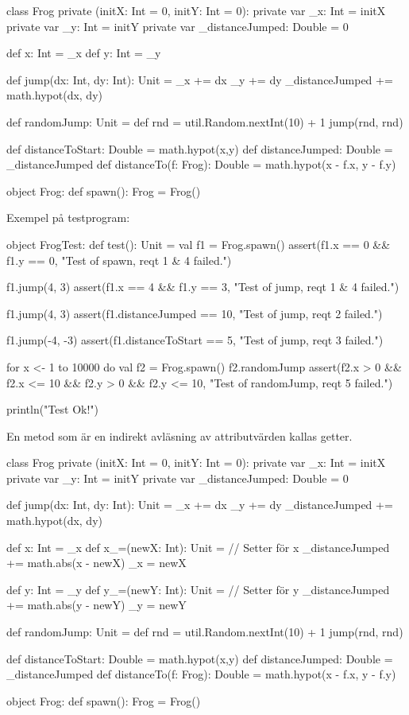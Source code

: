 \SOLUTION


\TaskSolved \what


\SubtaskSolved
\begin{Code}
class Frog private (initX: Int = 0, initY: Int = 0):
  private var _x: Int = initX
  private var _y: Int = initY
  private var _distanceJumped: Double = 0

  def x: Int = _x
  def y: Int = _y

  def jump(dx: Int, dy: Int): Unit =
    _x += dx
    _y += dy
    _distanceJumped += math.hypot(dx, dy)


  def randomJump: Unit =
    def rnd = util.Random.nextInt(10) + 1
    jump(rnd, rnd)

  def distanceToStart: Double = math.hypot(x,y)
  def distanceJumped: Double = _distanceJumped
  def distanceTo(f: Frog): Double = math.hypot(x - f.x, y - f.y)

object Frog:
  def spawn(): Frog = Frog()
\end{Code}

\SubtaskSolved Exempel på testprogram:
\begin{Code}
object FrogTest:
  def test(): Unit =
    val f1 = Frog.spawn()
    assert(f1.x == 0 && f1.y == 0, "Test of spawn, reqt 1 & 4 failed.")

    f1.jump(4, 3)
    assert(f1.x == 4 && f1.y == 3, "Test of jump, reqt 1 & 4 failed.")

    f1.jump(4, 3)
    assert(f1.distanceJumped == 10, "Test of jump, reqt 2 failed.")

    f1.jump(-4, -3)
    assert(f1.distanceToStart == 5, "Test of jump, reqt 3 failed.")

    for x <- 1 to 10000 do
      val f2 = Frog.spawn()
      f2.randomJump
      assert(f2.x > 0 && f2.x <= 10 && f2.y > 0 && f2.y <= 10,
        "Test of randomJump, reqt 5 failed.")

    println("Test Ok!")
\end{Code}

\SubtaskSolved  En metod som är en indirekt avläsning av attributvärden kallas getter.

\SubtaskSolved
\begin{Code}
class Frog private (initX: Int = 0, initY: Int = 0):
  private var _x: Int = initX
  private var _y: Int = initY
  private var _distanceJumped: Double = 0

  def jump(dx: Int, dy: Int): Unit =
    _x += dx
    _y += dy
    _distanceJumped += math.hypot(dx, dy)

  def x: Int = _x
  def x_=(newX: Int): Unit = // Setter för x
    _distanceJumped += math.abs(x - newX)
    _x = newX

  def y: Int = _y
  def y_=(newY: Int): Unit = // Setter för y
    _distanceJumped += math.abs(y - newY)
    _y = newY


  def randomJump: Unit =
    def rnd = util.Random.nextInt(10) + 1
    jump(rnd, rnd)

  def distanceToStart: Double = math.hypot(x,y)
  def distanceJumped: Double = _distanceJumped
  def distanceTo(f: Frog): Double = math.hypot(x - f.x, y - f.y)

object Frog:
  def spawn(): Frog = Frog()
\end{Code}

